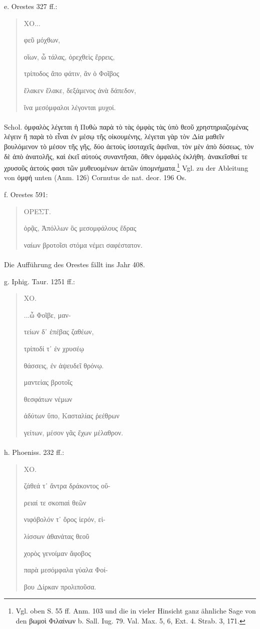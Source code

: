 \documentclass[a4paper, 11pt, oneside]{article}
\begin{document}
e. Orestes 327 ff.:
\begin{quotation}
ΧΟ...

φεῦ μόχθων,

οἵων, ὦ τάλας, ὀρεχθεὶς ἔρρεις,

τρίποδος ἄπο φάτιν, ἃν ὁ Φοῖβος

ἔλακεν ἔλακε, δεξάμενος ἀνὰ δάπεδον,

ἵνα μεσόμφαλοι λέγονται μυχοί.
\end{quotation}
\paragraph{}
Schol. ὀμφαλὸς λέγεται ἡ Πυθὼ παρὰ τὸ τὰς ὀμφὰς τὰς ὑπὸ θεοῦ χρηστηριαζομένας λέγειν ἢ παρὰ τὸ εἶναι ἐν μέσῳ τῆς οἰκουμένης, λέγεται γὰρ τὸν Δία μαθεῖν βουλόμενον τὸ μέσον τῆς γῆς, δύο ἀετοὺς ἰσοταχεῖς ἀφεῖναι, τὸν μὲν ἀπὸ δύσεως, τὸν δὲ ἀπὸ ἀνατολῆς, καὶ ἐκεῖ αὐτοὺς συναντῆσαι, ὅθεν ὀμφαλὸς ἐκλήθη. ἀνακεῖσθαί τε χρυσοῦς ἀετούς φασι τῶν μυθευομένων ἀετῶν ὑπομνήματα.\footnote{Vgl. oben S. 55 ff. Anm. 103 und die in vieler Hinsicht ganz ähnliche Sage von den βωμοὶ Φιλαίνων b. Sall. Iug. 79. Val. Max. 5, 6, Ext. 4. Strab. 3, 171.} Vgl. zu der Ableitung von ὀμφή unten (Anm. 126) Cornutus de nat. deor. 196 Os.

f. Orestes 591:
\begin{quotation}
ΟΡΕΣΤ.

ὁρᾷς, Ἀπόλλων ὃς μεσομφάλους ἕδρας

ναίων βροτοῖσι στόμα νέμει σαφέστατον.
\end{quotation}
\paragraph{}
Die Aufführung des Orestes fällt ins Jahr 408.

g. Iphig. Taur. 1251 ff.:
\begin{quotation}
ΧΟ.

...ὦ Φοῖβε, μαν-

τείων δ᾽ ἐπέβας ζαθέων,

τρίποδί τ᾽ ἐν χρυσέῳ

θάσσεις, ἐν ἀψευδεῖ θρόνῳ.

μαντείας βροτοῖς

θεσφάτων νέμων

ἀδύτων ὕπο, Κασταλίας ῥεέθρων

γείτων, μέσον γᾶς ἔχων μέλαθρον.
\end{quotation}
\paragraph{}
h. Phoeniss. 232 ff.:
\begin{quotation}
ΧΟ.

ζάθεά τ᾽ ἄντρα δράκοντος οὔ-

ρειαί τε σκοπιαὶ θεῶν

νιφόβολόν τ᾽ ὄρος ἱερόν, εἱ-

λίσσων ἀθανάτας θεοῦ

χορὸς γενοίμαν ἄφοβος

παρὰ μεσόμφαλα γύαλα Φοί-

βου Δίρκαν προλιποῦσα.
\end{quotation}
\end{document}
